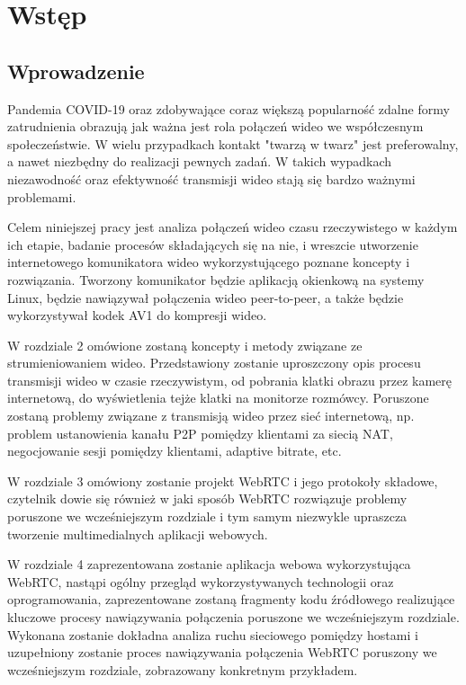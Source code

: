 \chapter{Wstęp}
\section{Wprowadzenie}

Pandemia COVID-19 oraz zdobywające coraz większą popularność zdalne formy zatrudnienia obrazują jak ważna jest rola
połączeń wideo we współczesnym społeczeństwie. W wielu przypadkach kontakt "twarzą w twarz" jest preferowalny, a nawet
niezbędny do realizacji pewnych zadań. W takich wypadkach niezawodność oraz efektywność transmisji wideo stają się
bardzo ważnymi problemami.

Celem niniejszej pracy jest analiza połączeń wideo czasu rzeczywistego w każdym ich etapie, badanie procesów
składających się na nie, i wreszcie utworzenie internetowego komunikatora wideo wykorzystującego poznane koncepty i
rozwiązania. Tworzony komunikator będzie aplikacją okienkową na systemy Linux, będzie nawiązywał połączenia wideo
peer-to-peer, a także będzie wykorzystywał kodek AV1 do kompresji wideo.

W rozdziale 2 omówione zostaną koncepty i metody związane ze strumieniowaniem wideo. Przedstawiony zostanie uproszczony
opis procesu transmisji wideo w czasie rzeczywistym, od pobrania klatki obrazu przez kamerę internetową, do wyświetlenia
tejże klatki na monitorze rozmówcy. Poruszone zostaną problemy związane z transmisją wideo przez sieć internetową, np.
problem ustanowienia kanału P2P pomiędzy klientami za siecią NAT, negocjowanie sesji pomiędzy klientami, adaptive
bitrate, etc.

W rozdziale 3 omówiony zostanie projekt WebRTC i jego protokoły składowe, czytelnik dowie się również w jaki sposób
WebRTC rozwiązuje problemy poruszone we wcześniejszym rozdziale i tym samym niezwykle upraszcza tworzenie
multimedialnych aplikacji webowych.

W rozdziale 4 zaprezentowana zostanie aplikacja webowa wykorzystująca WebRTC, nastąpi ogólny przegląd wykorzystywanych
technologii oraz oprogramowania, zaprezentowane zostaną fragmenty kodu źródłowego realizujące kluczowe procesy
nawiązywania połączenia poruszone we wcześniejszym rozdziale. Wykonana zostanie dokładna analiza ruchu sieciowego
pomiędzy hostami i uzupełniony zostanie proces nawiązywania połączenia WebRTC poruszony we wcześniejszym rozdziale,
zobrazowany konkretnym przykładem.

